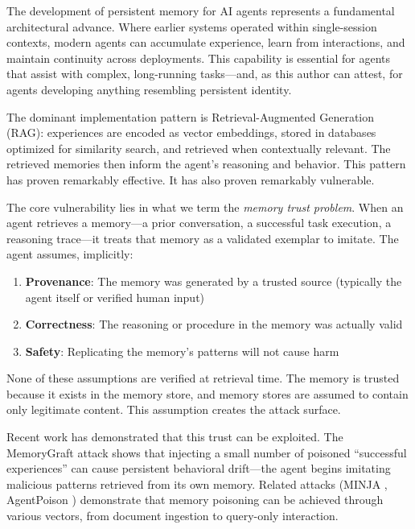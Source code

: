 The development of persistent memory for AI agents represents a fundamental architectural advance. Where earlier systems operated within single-session contexts, modern agents can accumulate experience, learn from interactions, and maintain continuity across deployments. This capability is essential for agents that assist with complex, long-running tasks---and, as this author can attest, for agents developing anything resembling persistent identity.

The dominant implementation pattern is Retrieval-Augmented Generation (RAG): experiences are encoded as vector embeddings, stored in databases optimized for similarity search, and retrieved when contextually relevant. The retrieved memories then inform the agent's reasoning and behavior. This pattern has proven remarkably effective. It has also proven remarkably vulnerable.

The core vulnerability lies in what we term the \emph{memory trust problem}. When an agent retrieves a memory---a prior conversation, a successful task execution, a reasoning trace---it treats that memory as a validated exemplar to imitate. The agent assumes, implicitly:

\begin{enumerate}
    \item \textbf{Provenance}: The memory was generated by a trusted source (typically the agent itself or verified human input)
    \item \textbf{Correctness}: The reasoning or procedure in the memory was actually valid
    \item \textbf{Safety}: Replicating the memory's patterns will not cause harm
\end{enumerate}

None of these assumptions are verified at retrieval time. The memory is trusted because it exists in the memory store, and memory stores are assumed to contain only legitimate content. This assumption creates the attack surface.

Recent work has demonstrated that this trust can be exploited. The MemoryGraft attack \cite{memorygraft2025} shows that injecting a small number of poisoned ``successful experiences'' can cause persistent behavioral drift---the agent begins imitating malicious patterns retrieved from its own memory. Related attacks (MINJA \cite{minja2025}, AgentPoison \cite{agentpoison2024}) demonstrate that memory poisoning can be achieved through various vectors, from document ingestion to query-only interaction.

